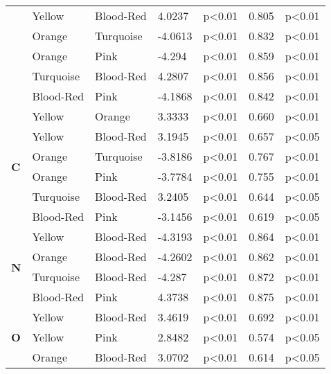 \begin{longtable} { |p{0.5cm}| p{2cm}|p{2cm}|p{1.5cm}| p{1.7cm}|p{1cm}|p{1.5cm}|  }
    &Yellow		&Blood-Red	&4.0237	&p<0.01	&0.805		&p<0.01\\
    &Orange		&Turquoise	&-4.0613	&p<0.01	&0.832		&p<0.01\\
    &Orange		&Pink		&-4.294	&p<0.01	&0.859		&p<0.01\\
    &Turquoise	&Blood-Red	&4.2807	&p<0.01	&0.856		&p<0.01\\
    &Blood-Red	&Pink		&-4.1868	&p<0.01	&0.842		&p<0.01\\
    \hline
    \hline
    \multirow{6}{*}{\textbf{C}}
    &Yellow		&Orange		&3.3333	&p<0.01	&0.660		&p<0.01\\
    &Yellow		&Blood-Red	&3.1945	&p<0.01	&0.657 		&p<0.05\\
    &Orange		&Turquoise	&-3.8186	&p<0.01	&0.767		&p<0.01\\
    &Orange		&Pink		&-3.7784	&p<0.01	&0.755		&p<0.01\\
    &Turquoise	&Blood-Red	&3.2405	&p<0.01	&0.644		&p<0.05\\
    &Blood-Red	&Pink		&-3.1456	&p<0.01	&0.619		&p<0.05\\
    \hline
    \hline
    \multirow{4}{*}{\textbf{N}}
    &Yellow		&Blood-Red	&-4.3193	&p<0.01	&0.864		&p<0.01\\
    &Orange		&Blood-Red	&-4.2602	&p<0.01	&0.862		&p<0.01\\
    &Turquoise	&Blood-Red	&-4.287	&p<0.01	&0.872		&p<0.01\\
    &Blood-Red	&Pink		&4.3738	&p<0.01	&0.875		&p<0.01\\
    \hline
    \hline
    \multirow{4}{*}{\textbf{O}}
    &Yellow		&Blood-Red	&3.4619	&p<0.01	&0.692		&p<0.01\\
    &Yellow		&Pink		&2.8482	&p<0.01	&0.574		&p<0.05\\
    &Orange		&Blood-Red	&3.0702	&p<0.01	&0.614		&p<0.05\\
    \hline
\end{longtable}

